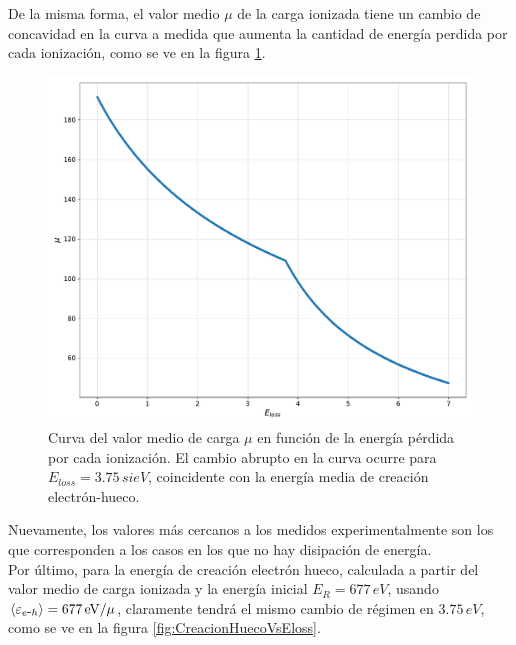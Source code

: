 \indent De la misma forma, el valor medio $\mu$ de la carga ionizada tiene un cambio de concavidad en la curva a medida que aumenta la cantidad de energía perdida por cada ionización, como se ve en la figura \ref{fig:ElossVsMu}.
\begin{figure}%
    \centering
    \includegraphics[scale=0.35]{Figs/ELoss_vs_mu_5ktrials_0-7Eloss.pdf}
    \caption{\footnotesize{Curva del valor medio de carga $\mu$ en función de la energía pérdida por cada ionización. El cambio abrupto en la curva ocurre para $E_{loss} = 3.75\,si{eV}$, coincidente con la energía media de creación electrón-hueco.}}
    \label{fig:ElossVsMu}
\end{figure}
Nuevamente, los valores más cercanos a los medidos experimentalmente son los que corresponden a los casos en los que no hay disipación de energía.\\
\indent Por último, para la energía de creación electrón hueco, calculada a partir del valor medio de carga ionizada y la energía inicial $E_{R} = 677\,\si{eV}$, usando $\left\langle\varepsilon_{\eh} \right\rangle= 677\,\si{eV}/\mu$, claramente tendrá el mismo cambio de régimen en $3.75\,\si{eV}$, como se ve en la figura \ref{fig:CreacionHuecoVsEloss}.\\
